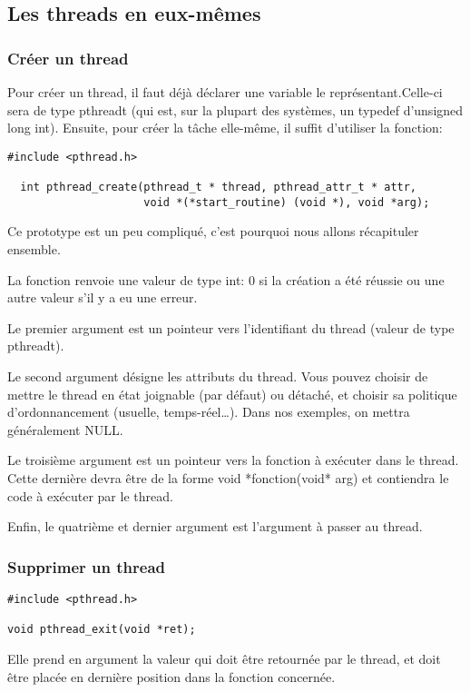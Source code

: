 \documentclass[a4paper]{article}
\begin{document}
\subsection{Les threads en eux-mêmes}
\subsubsection{Créer un thread}
Pour créer un thread, il faut déjà déclarer une variable le représentant.Celle-ci sera de type pthread\textunderscore{}t (qui est, sur la plupart des systèmes, un typedef d'unsigned long int). Ensuite, pour créer la tâche elle-même, il suffit d'utiliser la fonction:
\begin{lstlisting}
#include <pthread.h>

  int pthread_create(pthread_t * thread, pthread_attr_t * attr,
                     void *(*start_routine) (void *), void *arg);
\end{lstlisting}
Ce prototype est un peu compliqué, c'est pourquoi nous allons récapituler ensemble.
\begin{description}
  \item La fonction renvoie une valeur de type int: 0 si la création a été réussie ou une autre valeur s'il y a eu une erreur.
  \item Le premier argument est un pointeur vers l'identifiant du thread (valeur de type pthread\textunderscore{}t).
  \item Le second argument désigne les attributs du thread. Vous pouvez choisir de mettre le thread en état joignable (par défaut) ou détaché, et choisir sa politique d'ordonnancement (usuelle, temps-réel\ldots). Dans nos exemples, on mettra généralement NULL.
  \item Le troisième argument est un pointeur vers la fonction à exécuter dans le thread. Cette dernière devra être de la forme \guillemotleft{}void *fonction(void* arg)\guillemotright{} et contiendra le code à exécuter par le thread.
  \item Enfin, le quatrième et dernier argument est l'argument à passer au thread.
\end{description}
\subsubsection{Supprimer un thread}
\begin{lstlisting}
#include <pthread.h>

void pthread_exit(void *ret);
\end{lstlisting}
Elle prend en argument la valeur qui doit être retournée par le thread, et doit être placée en dernière position dans la fonction concernée.
\newpage
\end{document}
